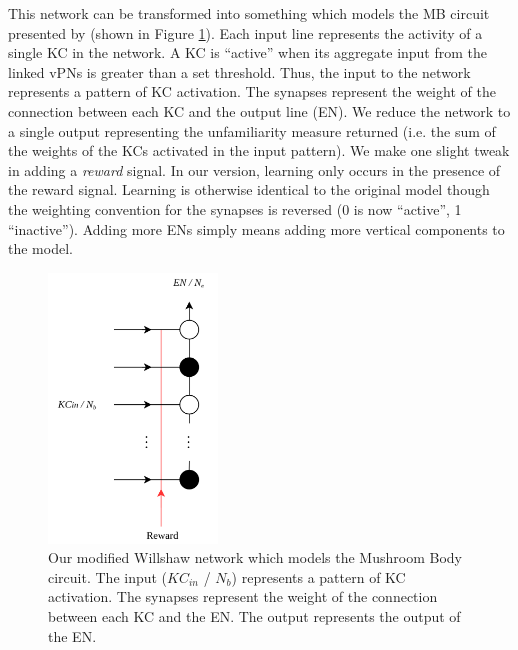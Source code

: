\documentclass[a4paper,11pt,twoside,openright]{article}
\begin{document}
This network can be transformed into something which models the MB circuit presented by \cite{Ardin2016}(shown in Figure \ref{fig:willshawmb}).
Each input line represents the activity of a single KC in the network. A KC is ``active'' when its aggregate input from the linked vPNs is
greater than a set threshold. Thus, the input to the network represents a pattern of KC activation. The synapses represent the weight of the
connection between each KC and the output line (EN). We reduce the network to a single output representing the
unfamiliarity measure returned (i.e. the sum of the weights of the KCs activated in the input pattern). We
make one slight tweak in adding a \textit{reward} signal. In our version, learning only occurs in the presence of
the reward signal. Learning is otherwise identical to the original model though the weighting convention for the synapses is reversed (0 is now ``active'', 1 ``inactive'').
Adding more ENs simply means adding more vertical components to the model. 

\begin{figure}[h]
 
  \centering
  \includegraphics[width=0.4\textwidth]{WillshawMB}
  \caption{
    \label{fig:willshawmb} Our modified Willshaw network which models the Mushroom Body circuit. The input ($KC_{in}$ / $N_b$)
    represents a pattern of KC activation. The synapses represent the weight of the connection between each KC and the EN.
    The output represents the output of the EN.
  }
 
\end{figure}
\newpage
\end{document}
